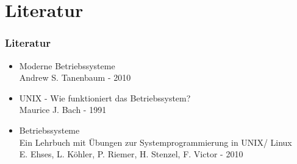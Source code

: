 \documentclass[ddcfooter,nosectionnum]{tudbeamer}
\begin{document}
\section{Literatur}
\begin{frame}
    \frametitle{Literatur}
    \begin{itemize}
         \item  Moderne Betriebssysteme \\
        		Andrew S. Tanenbaum - 2010
	\item	 UNIX - Wie funktioniert das Betriebssystem? \\
		Maurice J. Bach - 1991
	\item Betriebssysteme\\
		Ein Lehrbuch mit Übungen zur Systemprogrammierung in UNIX/ Linux \\
		E. Ehses, L. Köhler, P. Riemer, H. Stenzel, F. Victor - 2010	
    \end{itemize}
    
\end{frame}
\end{document}
